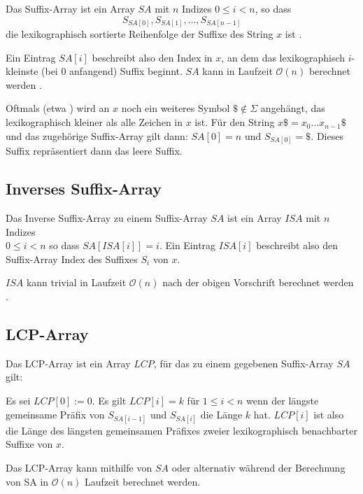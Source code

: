Das Suffix-Array ist ein Array $SA$ mit $n$ Indizes $0 \leq i < n$, so dass 
\begin{equation*}
    S_{SA[0]}, S_{SA[1]}, \dots, S_{SA[n-1]}
\end{equation*}
die lexikographisch sortierte Reihenfolge der Suffixe des String $x$ ist \cite{abouelhoda_replacing_2004, manber_suffix_1993}.

Ein Eintrag $SA[i]$ beschreibt also den Index in $x$, an dem das lexikographisch $i$-kleinste (bei $0$ anfangend) Suffix beginnt. $SA$ kann in Laufzeit $\mathcal{O}(n)$ berechnet werden \cite{nong_two_2011}. 

Oftmals (etwa \cite{fischer_inducing_2011, nong_two_2011}) wird an $x$ noch ein weiteres Symbol $\$ \notin \Sigma$ angehängt, das lexikographisch kleiner als alle Zeichen in $x$ ist. Für den String $x\$ = x_0\dots x_{n-1} \$$ und das zugehörige Suffix-Array gilt dann: $SA[0] = n$ und $S_{SA[0]} = \$$. Dieses Suffix repräsentiert dann das leere Suffix.

\subsection{Inverses Suffix-Array}

Das Inverse Suffix-Array zu einem Suffix-Array $SA$ ist ein Array $ISA$ mit $n$ Indizes \\
$0 \leq i < n$ so dass $SA[ISA[i]] = i$.
Ein Eintrag $ISA[i]$ beschreibt also den Suffix-Array Index des Suffixes $S_i$ von $x$.

$ISA$ kann trivial in Laufzeit $\mathcal{O}(n)$ nach der obigen Vorschrift berechnet werden \cite{abouelhoda_replacing_2004}.

\subsection{LCP-Array}

Das LCP-Array ist ein Array $LCP$, für das zu einem gegebenen Suffix-Array $SA$ gilt: 

Es sei $LCP[0] := 0$. Es gilt $LCP[i] = k$ für $1 \leq i < n$ wenn der längste gemeinsame Präfix von $S_{SA[i-1]}$ und $S_{SA[i]}$ die Länge $k$ hat. $LCP[i]$ ist also die Länge des längsten gemeinsamen Präfixes zweier lexikographisch benachbarter Suffixe von $x$. 

Das LCP-Array kann mithilfe von $SA$ \cite{kasai_linear-time_2001} oder alternativ während der Berechnung von SA \cite{fischer_inducing_2011} in $\mathcal{O}(n)$ Laufzeit berechnet werden. 